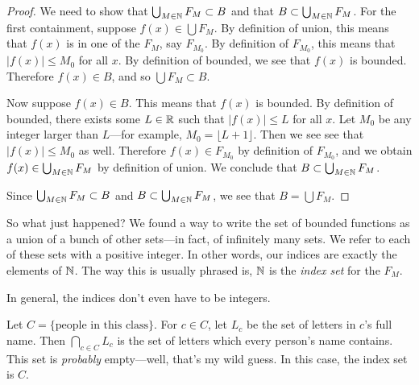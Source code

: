 \documentclass{tufte-book}
\begin{document}
\begin{proof}
  We need to show that $\bigcup_{M \in \mathbb{N}} F_M \subset B$ and that $B \subset \bigcup_{M \in \mathbb{N}} F_M$. For the first containment, suppose $f(x) \in \bigcup F_M$. By definition of union, this means that $f(x)$ is in one of the $F_M$, say $F_{M_0}$.  By definition of $F_{M_0}$, this means that $|f(x)| \leq M_0$ for all $x$. By definition of bounded, we see that $f(x)$ is bounded. Therefore $f(x) \in B$, and so $\bigcup F_M \subset B$.

  Now suppose $f(x) \in B$. This means that $f(x)$ is bounded. By definition of bounded,  there exists some $L \in \mathbb{R}$ such that $|f(x)| \leq L$ for all $x$. Let $M_0$ be any integer larger than $L$---for example, $M_0 = \lfloor L + 1\rfloor$. Then we see see that $|f(x)| \leq M_0$ as well. Therefore $f(x) \in F_{M_0}$ by definition of $F_{M_0}$, and we obtain $f(x) \in \bigcup_{M \in \mathbb{N}} F_M$ by definition of union. We conclude that $B \subset \bigcup_{M \in \mathbb{N}} F_M$.

  Since $\bigcup_{M \in \mathbb{N}} F_M \subset B$ and $B \subset \bigcup_{M \in \mathbb{N}} F_M$, we see that $B = \bigcup F_M$.
\end{proof}

So what just happened? We found a way to write the set of bounded functions as a union of a bunch of other sets---in fact, of infinitely many sets. We refer to each of these sets with a positive integer. In other words, our indices are exactly the elements of $\mathbb{N}$. The way this is usually phrased is, $\mathbb{N}$ is the \emph{index set} for the $F_M$. 

In general, the indices don't even have to be integers.
\begin{example}
  Let $C = \{\text{people in this class}\}$. For $c \in C$, let $L_c$ be the set of letters in $c$'s full name. Then $\displaystyle\bigcap_{c \in C} L_c$ is the set of letters which every person's name contains. This set is \emph{probably} empty---well, that's my wild guess. In this case, the index set is $C$.
\end{example}
\end{document}
